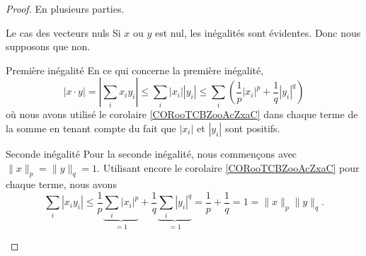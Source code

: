 \begin{proof}
    En plusieurs parties.
    \begin{subproof}
        \item[Le cas des vecteurs nuls]
            Si \( x\) ou \( y\) est nul, les inégalités sont évidentes. Donc nous supposons que non.
        \item[Première inégalité]
            En ce qui concerne la première inégalité,
            \begin{equation}
                | x\cdot y |=| \sum_ix_iy_i |\leq \sum_i| x_i | |y_i |\leq \sum_i\left( \frac{1}{ p }| x_i |^p+\frac{1}{ q }| y_i |^q \right)
            \end{equation}
            où nous avons utilisé le corolaire \ref{CORooTCBZooAcZxaC} dans chaque terme de la somme en tenant compte du fait que \( | x_i |\) et \( | y_i |\) sont positifs.
        \item[Seconde inégalité]
            Pour la seconde inégalité, nous commençons avec \( \| x \|_p=\| y \|_q=1\). Utilisant encore le corolaire \ref{CORooTCBZooAcZxaC} pour chaque terme, nous avons
            \begin{equation}
                \sum_i| x_iy_i |\leq\frac{1}{ p }\underbrace{\sum_i| x_i |^p}_{=1}+\frac{1}{ q }\underbrace{\sum_i| y_i |^q}_{=1}=\frac{1}{ p }+\frac{1}{ q }=1=\| x \|_p\| y \|_q.
            \end{equation}


\end{subproof}
\end{proof}
